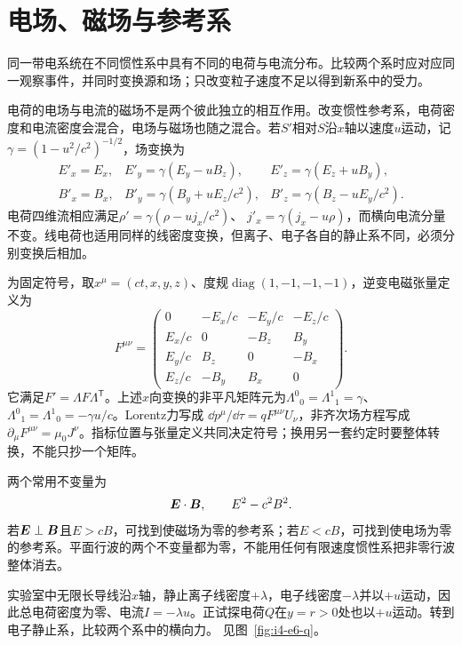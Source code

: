 \section{电场、磁场与参考系}\label{sec:i4-relative}
同一带电系统在不同惯性系中具有不同的电荷与电流分布。比较两个系时应对应同一观察事件，并同时变换源和场；只改变粒子速度不足以得到新系中的受力。

电荷的电场与电流的磁场不是两个彼此独立的相互作用。改变惯性参考系，电荷密度和电流密度会混合，电场与磁场也随之混合。若$S'$相对$S$沿$x$轴以速度$u$运动，记$\gamma=(1-u^2/c^2)^{-1/2}$，场变换为
\[
\begin{array}{lll}
E'_x=E_x,&E'_y=\gamma(E_y-uB_z),&E'_z=\gamma(E_z+uB_y),\\
B'_x=B_x,&B'_y=\gamma(B_y+uE_z/c^2),&
B'_z=\gamma(B_z-uE_y/c^2).
\end{array}
\]
电荷四维流相应满足$\rho'=\gamma(\rho-uj_x/c^2)$、
$j'_x=\gamma(j_x-u\rho)$，而横向电流分量不变。线电荷也适用同样的线密度变换，但离子、电子各自的静止系不同，必须分别变换后相加。

为固定符号，取$x^\mu=(ct,x,y,z)$、度规$\operatorname{diag}(1,-1,-1,-1)$，逆变电磁张量定义为
\[
F^{\mu\nu}=
\begin{pmatrix}
0&-E_x/c&-E_y/c&-E_z/c\\
E_x/c&0&-B_z&B_y\\
E_y/c&B_z&0&-B_x\\
E_z/c&-B_y&B_x&0
\end{pmatrix}.
\]
它满足$F'=\Lambda F\Lambda^{\mathsf T}$。上述$x$向变换的非平凡矩阵元为$\Lambda^0{}_0=\Lambda^1{}_1=\gamma$、
$\Lambda^0{}_1=\Lambda^1{}_0=-\gamma u/c$。Lorentz力写成
$\dd p^\mu/\dd\tau=qF^{\mu\nu}U_\nu$，非齐次场方程写成$\partial_\mu F^{\mu\nu}=\mu_0J^\nu$。指标位置与张量定义共同决定符号；换用另一套约定时要整体转换，不能只抄一个矩阵。

两个常用不变量为
\[
\bm{E}\cdot\bm{B},\qquad E^2-c^2B^2.
\]
若$\bm{E}\perp\bm{B}$且$E>cB$，可找到使磁场为零的参考系；若$E<cB$，可找到使电场为零的参考系。平面行波的两个不变量都为零，不能用任何有限速度惯性系把非零行波整体消去。


\begin{example}[中性电流导线在电子静止系中为何带电]\label{ex:i4-e6}

实验室中无限长导线沿$x$轴，静止离子线密度$+\lambda$，电子线密度$-\lambda$并以$+u$运动，因此总电荷密度为零、电流$I=-\lambda u$。正试探电荷$Q$在$y=r>0$处也以$+u$运动。转到电子静止系，比较两个系中的横向力。
 见图~\ref{fig:i4-e6-q}。
\end{example}


